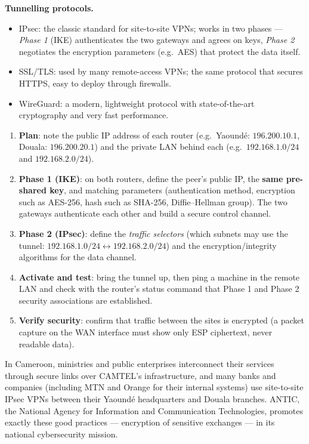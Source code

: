 \documentclass[11pt]{article}
\newcommand{\cle}[1]{{\popxbold\color{popdark}#1}}
\begin{document}
\textbf{Tunnelling protocols.}
\begin{itemize}
\item \cle{IPsec}: the classic standard for site-to-site VPNs; works in two phases — \emph{Phase 1} (IKE) authenticates the two gateways and agrees on keys, \emph{Phase 2} negotiates the encryption parameters (e.g.\ AES) that protect the data itself.
\item \cle{SSL/TLS}: used by many remote-access VPNs; the same protocol that secures HTTPS, easy to deploy through firewalls.
\item \cle{WireGuard}: a modern, lightweight protocol with state-of-the-art cryptography and very fast performance.
\end{itemize}

\begin{methode}
\begin{enumerate}
\item \textbf{Plan}: note the public IP address of each router (e.g.\ Yaoundé: $196.200.10.1$, Douala: $196.200.20.1$) and the private LAN behind each (e.g.\ $192.168.1.0/24$ and $192.168.2.0/24$).
\item \textbf{Phase 1 (IKE)}: on both routers, define the peer's public IP, the \textbf{same pre-shared key}, and matching parameters (authentication method, encryption such as AES-256, hash such as SHA-256, Diffie--Hellman group). The two gateways authenticate each other and build a secure control channel.
\item \textbf{Phase 2 (IPsec)}: define the \emph{traffic selectors} (which subnets may use the tunnel: $192.168.1.0/24 \leftrightarrow 192.168.2.0/24$) and the encryption/integrity algorithms for the data channel.
\item \textbf{Activate and test}: bring the tunnel up, then ping a machine in the remote LAN and check with the router's status command that Phase 1 and Phase 2 security associations are established.
\item \textbf{Verify security}: confirm that traffic between the sites is encrypted (a packet capture on the WAN interface must show only ESP ciphertext, never readable data).
\end{enumerate}
\end{methode}

\begin{savaistu}
In Cameroon, ministries and public enterprises interconnect their services through secure links over CAMTEL's infrastructure, and many banks and companies (including MTN and Orange for their internal systems) use site-to-site IPsec VPNs between their Yaoundé headquarters and Douala branches. ANTIC, the National Agency for Information and Communication Technologies, promotes exactly these good practices — encryption of sensitive exchanges — in its national cybersecurity mission.
\end{savaistu}
\end{document}
